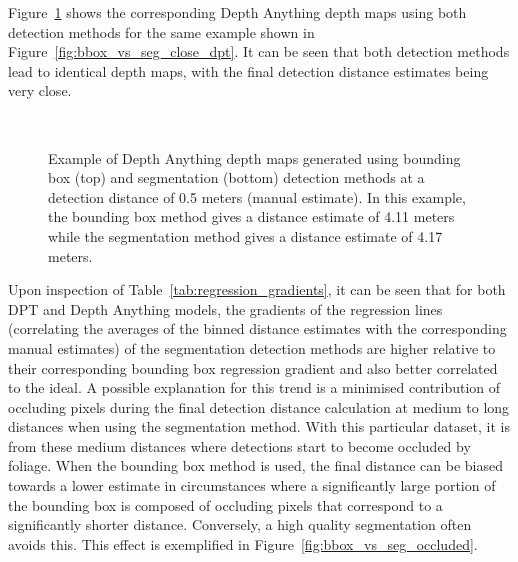Figure~\ref{fig:bbox_vs_seg_close_da} shows the corresponding Depth Anything depth maps using both
detection methods for the same example shown in Figure~\ref{fig:bbox_vs_seg_close_dpt}.
It can be seen that both detection methods lead to identical depth maps, with the final detection
distance estimates being very close.

\begin{figure}[htbp]
    \centering
    \\[1mm]
    \caption{Example of Depth Anything depth maps generated using bounding box (top) and segmentation
        (bottom) detection methods at a detection distance of 0.5 meters (manual estimate).
        In this example, the bounding box method gives a distance estimate of 4.11 meters
        while the segmentation method gives a distance estimate of 4.17 meters.}
    \label{fig:bbox_vs_seg_close_da}
\end{figure}

Upon inspection of Table~\ref{tab:regression_gradients}, it can be seen that for both DPT and Depth
Anything models, the gradients of the regression lines (correlating the averages of the binned
distance estimates with the corresponding manual estimates) of the segmentation detection methods
are higher relative to their corresponding bounding box regression gradient and also better
correlated to the ideal.
A possible explanation for this trend is a minimised contribution of occluding pixels during the
final detection distance calculation at medium to long distances when using the segmentation method.
With this particular dataset, it is from these medium distances where detections start to become
occluded by foliage.
When the bounding box method is used, the final distance can be biased towards a lower estimate in
circumstances where a significantly large portion of the bounding box is composed of occluding pixels
that correspond to a significantly shorter distance.
Conversely, a high quality segmentation often avoids this.
This effect is exemplified in Figure~\ref{fig:bbox_vs_seg_occluded}.

